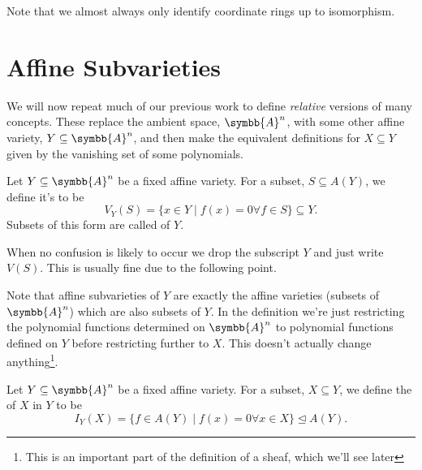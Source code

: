 \documentclass[fleqn]{NotesClass}
\newcommand{\subideal}{\trianglelefteq}
\newcommand{\affine}{\symbb{A}}
\begin{document}
    Note that we almost always only identify coordinate rings up to isomorphism.
    
    \section{Affine Subvarieties}
    We will now repeat much of our previous work to define \emph{relative} versions of many concepts.
    These replace the ambient space, \(\affine^n\), with some other affine variety, \(Y \subseteq \affine^n\), and then make the equivalent definitions for \(X \subseteq Y\) given by the vanishing set of some polynomials.
    
    \begin{dfn}{}{}
        Let \(Y \subseteq \affine^n\) be a fixed affine variety.
        For a subset, \(S \subseteq A(Y)\), we define it's  to be
        \begin{equation}
            V_Y(S) = \{x \in Y \mid f(x) = 0 \forall f \in S\} \subseteq Y.
        \end{equation}
        Subsets of this form are called  of \(Y\).
    \end{dfn}
    
    \begin{ntn}{}{}
        When no confusion is likely to occur we drop the subscript \(Y\) and just write \(V(S)\).
        This is usually fine due to the following point.
    \end{ntn}
    
    Note that affine subvarieties of \(Y\) are exactly the affine varieties (subsets of \(\affine^n\)) which are also subsets of \(Y\).
    In the definition we're just restricting the polynomial functions determined on \(\affine^n\) to polynomial functions defined on \(Y\) before restricting further to \(X\).
    This doesn't actually change anything\footnote{This is an important part of the definition of a sheaf, which we'll see later}.
    
    \begin{dfn}{}{}
        Let \(Y \subseteq \affine^n\) be a fixed affine variety.
        For a subset, \(X \subseteq Y\), we define the  of \(X\) in \(Y\) to be
        \begin{equation}
            I_Y(X) = \{f \in A(Y) \mid f(x) = 0 \forall x \in X\} \subideal A(Y).
        \end{equation}
    \end{dfn}
    
\end{document}
